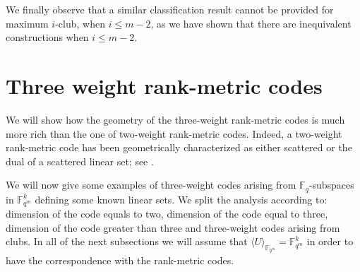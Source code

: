 \documentclass[11pt]{amsart}
\theoremstyle{definition}
\newcommand{\F}{{\mathbb F}}
\newcommand{\fq}{{\mathbb F}_{q}}
\newcommand{\PG}{\mathrm{PG}}
\newcommand{\fqm}{\mathbb{F}_{q^m}}
\begin{document}


We finally observe that a similar classification result cannot be provided for maximum $i$-club, when $i\leq m-2$, as we have shown that there are inequivalent constructions when $i\leq m-2$.

\section{Three weight rank-metric codes}\label{sec:threeweights}


We will show how the geometry of the three-weight rank-metric codes is much more rich than the one of two-weight rank-metric codes.
Indeed, a two-weight rank-metric code has been geometrically characterized as either scattered or the dual of a scattered linear set; see \cite{zullo2024two,pratihar2024antipodal}.


We will now give some examples of three-weight codes arising from $\fq$-subspaces in $\F_{q^m}^k$ defining some known linear sets.
We split the analysis according to: dimension of the code equals to two, dimension of the code equal to three, dimension of the code greater than three and three-weight codes arising from clubs.
In all of the next subsections we will assume that $\langle U \rangle_{\F_{q^m}}=\F_{q^m}^k$ in order to have the correspondence with the rank-metric codes.
\end{document}
